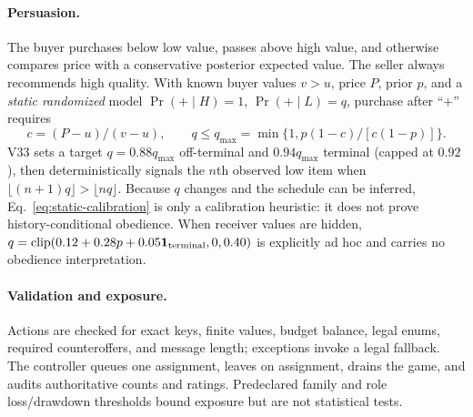 \paragraph{Persuasion.}
The buyer purchases below low value, passes above high value, and otherwise
compares price with a conservative posterior expected value. The seller always
recommends high quality. With known buyer values $v>u$, price $P$, prior $p$,
and a \emph{static randomized} model $\Pr(+\mid H)=1$,
$\Pr(+\mid L)=q$, purchase after ``+'' requires
\begin{equation}
 c=(P-u)/(v-u),\qquad
 q\le q_{\max}=\min\{1,p(1-c)/[c(1-p)]\}.
 \label{eq:static-calibration}
\end{equation}
V33 sets a target $q=0.88q_{\max}$ off-terminal and $0.94q_{\max}$ terminal
(capped at $0.92$), then deterministically signals the $n$th observed low item
when $\lfloor(n+1)q\rfloor>\lfloor nq\rfloor$. Because $q$ changes and the
schedule can be inferred, Eq.~\ref{eq:static-calibration} is only a calibration
heuristic: it does not prove history-conditional obedience. When receiver values
are hidden, $q=\operatorname{clip}(0.12+0.28p+0.05\mathbf{1}_{\rm terminal},0,0.40)$
is explicitly ad hoc and carries no obedience interpretation.

\paragraph{Validation and exposure.}
Actions are checked for exact keys, finite values, budget balance, legal enums,
required counteroffers, and message length; exceptions invoke a legal fallback.
The controller queues one assignment, leaves on assignment, drains the game,
and audits authoritative counts and ratings. Predeclared family and role
loss/drawdown thresholds bound exposure but are not statistical tests.
